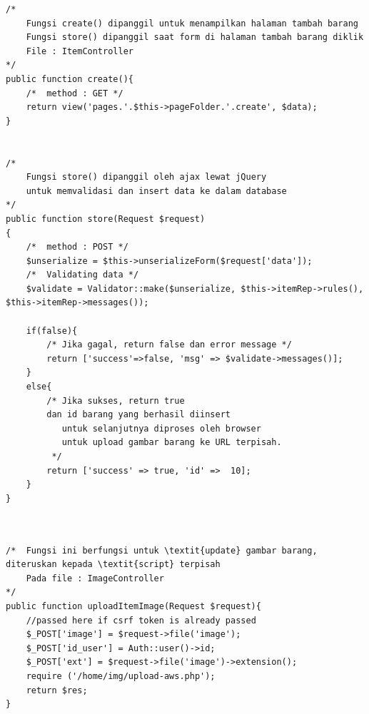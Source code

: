 \newpage
 \begin{lstlisting}[label=cdbe.03-01,style=php,caption=Implementasi \textit{Back-end} Mendaftarkan Barang untuk Dilelang]
/*
    Fungsi create() dipanggil untuk menampilkan halaman tambah barang
    Fungsi store() dipanggil saat form di halaman tambah barang diklik
    File : ItemController
*/
public function create(){
    /*  method : GET */
    return view('pages.'.$this->pageFolder.'.create', $data);
}


/*
    Fungsi store() dipanggil oleh ajax lewat jQuery
    untuk memvalidasi dan insert data ke dalam database
*/
public function store(Request $request)
{
    /*  method : POST */
    $unserialize = $this->unserializeForm($request['data']);
    /*  Validating data */
    $validate = Validator::make($unserialize, $this->itemRep->rules(), $this->itemRep->messages());

    if(false){
        /* Jika gagal, return false dan error message */
        return ['success'=>false, 'msg' => $validate->messages()];
    }
    else{
	    /* Jika sukses, return true 
	    dan id barang yang berhasil diinsert
	       untuk selanjutnya diproses oleh browser
	       untuk upload gambar barang ke URL terpisah.
	     */
	    return ['success' => true, 'id' =>  10];
    }
}
	  
	  
\end{lstlisting}

\begin{lstlisting}[label=cdjq.03-01,style=php,caption=Implementasi \textit{Back-end} Mendaftarkan Barang untuk Dilelang]
/*	Fungsi ini berfungsi untuk \textit{update} gambar barang, diteruskan kepada \textit{script} terpisah 
    Pada file : ImageController
*/
public function uploadItemImage(Request $request){
    //passed here if csrf token is already passed
    $_POST['image'] = $request->file('image');
    $_POST['id_user'] = Auth::user()->id;
    $_POST['ext'] = $request->file('image')->extension();
    require ('/home/img/upload-aws.php');
    return $res;
}
\end{lstlisting}



